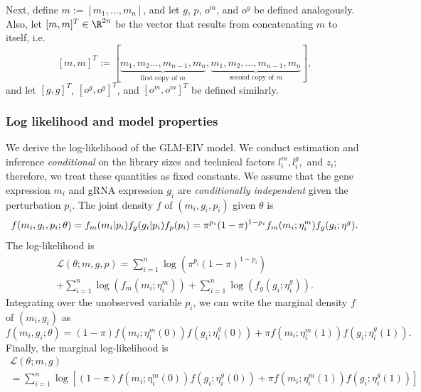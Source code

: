 \documentclass[12pt]{article}
\begin{document}
Next, define $m := [m_1, \dots, m_n]$, and let $g$, $p$, $o^m$, and $o^g$ be defined analogously. Also, let $[m,m]^T \in \R^{2n}$ be the vector that results from concatenating $m$ to itself, i.e.
$$ [m,m]^T := [\underbrace{m_1, m_2 \dots, m_{n-1}, m_n}_\textrm{first copy of $m$}, \underbrace{m_1, m_2, \dots, m_{n-1}, m_n}_\textrm{second copy of $m$}],$$ and let $[g,g]^T$, $[o^g,o^g]^T$, and $[o^m,o^m]^T$ be defined similarly. 

\subsubsection*{Log likelihood and model properties}
We derive the log-likelihood of the GLM-EIV model. We conduct estimation and inference \textit{conditional} on the library sizes and technical factors $l^m_i, l^g_i,$ and $z_i$; therefore, we treat these quantities as fixed constants. We assume that the gene expression $m_i$ and gRNA expression $g_i$ are \textit{conditionally independent} given the perturbation $p_i$. The joint density $f$ of $(m_i, g_i, p_i)$ given $\theta$ is
\begin{equation}\label{full_density}
f(m_i,g_i,p_i; \theta) = f_m(m_i | p_i) f_g(g_i | p_i) f_p(p_i) \\ = \pi^{p_i}(1-\pi)^{1-p_i} f_m(m_i; \eta^m_i) f_g(g_i; \eta^g).
\end{equation}
The log-likelihood is
\begin{multline}\label{full_log_lik}
\mathcal{L}(\theta; m, g, p) = \sum_{i=1}^n \log\left( \pi^{p_i}(1-\pi)^{1-p_i} \right) \\ + \sum_{i=1}^n \log\left( f_m(m_i; \eta^m_i)\right) + \sum_{i=1}^n \log\left( f_g(g_i; \eta_i^g) \right). \end{multline}
Integrating over the unobserved variable $p_i$, we can write the marginal density $f$ of $(m_i, g_i)$ as
\begin{equation}\label{marginal_density}
f(m_i, g_i; \theta) = (1-\pi) f(m_i; \eta^m_i(0)) f(g_i; \eta^g_i(0)) + \pi f(m_i; \eta^m_i(1)) f(g_i; \eta^g_i(1)).
\end{equation}
Finally, the marginal log-likelihood is
\begin{multline}\label{marginal_log_lik}
\mathcal{L}(\theta; m, g) \\ = \sum_{i=1}^n \log\left[ (1-\pi) f(m_i; \eta^m_i(0)) f(g_i; \eta^g_i(0)) + \pi f(m_i; \eta^m_i(1)) f(g_i; \eta^g_i(1)) \right]
\end{multline}
\end{document}
